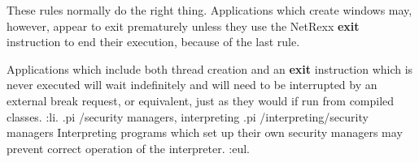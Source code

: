 These rules normally do the right thing.  Applications which
create windows may, however, appear to exit prematurely unless they use
the NetRexx \textbf{exit} instruction to end their execution, because of
the last rule.

Applications which include both thread creation and an \textbf{exit}
instruction which is never executed will wait indefinitely and will need
to be interrupted by an external break request, or equivalent,
just as they would if run from compiled classes.
:li.
.pi /security managers, interpreting
.pi /interpreting/security managers
Interpreting programs which set up their own security managers may
prevent correct operation of the interpreter.
:eul.
